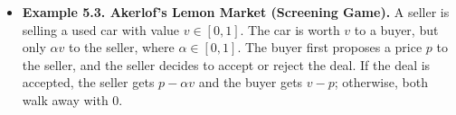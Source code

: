 \documentclass[notitlepage]{article}
\begin{document}
\begin{itemize}
\begin{enumerate}
\begin{itemize}
            \item Since the information set \(\{(Eagle, G),(Dove,G)\}\) is not reached, the professor is free to have any belief. Let \(p\) be the belief that the student is Eagle.
            \item If \(p \ge 0.5\), complying is a best response. However, if the professor always complies, not going is not a best response for both. This is not a PBE.
            \item If \(p \le 0.5\), not complying is a best response. Not going is then also a best response for both types. This is a PBE.
        \end{itemize}
    \end{enumerate}

    \item \textbf{Example 5.3. Akerlof's Lemon Market (Screening Game).} A seller is selling a used car with value \(v \in [0,1]\). The car is worth \(v\) to a buyer, but only \(\alpha v\) to the seller, where \(\alpha \in [0,1]\). The buyer first proposes a price \(p\) to the seller, and the seller decides to accept or reject the deal. If the deal is accepted, the seller gets \(p-\alpha v\) and the buyer gets \(v-p\); otherwise, both walk away with 0.


\end{itemize}
\end{document}
